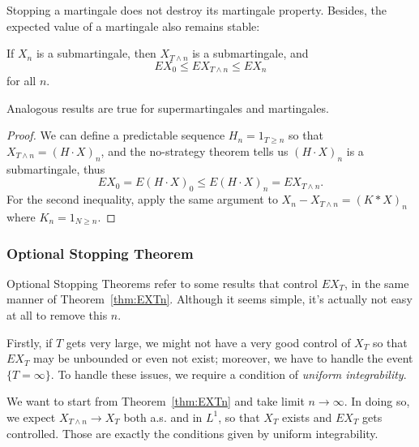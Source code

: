 Stopping a martingale does not destroy its martingale property. Besides, the expected value of a martingale also remains stable:
\begin{theorem}
	\label{thm:EXTn}
	If $X_n$ is a submartingale, then $X_{T \wedge n}$ is a submartingale, and 
	\[
		E X_0 \le  E X_{T \wedge n}  \le  E X_n
	\]
	for all $n$. 

	Analogous results are true for supermartingales and martingales.
\end{theorem}
\begin{proof}
	We can define a predictable sequence $H_n = 1_{T \ge n}$ so that 
	$X_{T \wedge n} = \left( H \cdot X \right) _n$,
	and the no-strategy theorem tells us $(H \cdot X)_n$ is a submartingale, thus
	\[
		E X_0 = E (H \cdot X)_0 \le E(H \cdot X)_n = E X_{T \wedge n}
	.\] 
	For the second inequality, apply the same argument to $X_n - X_{T \wedge n} = (K * X)_n$ where $K_n = 1_{N \ge n}$.
\end{proof}


\subsubsection{Optional Stopping Theorem}

Optional Stopping Theorems refer to some results that control $E X_T$, in the same manner of Theorem~\ref{thm:EXTn}. Although it seems simple, it's actually not easy at all to remove this $n$.

Firstly, if $T$ gets very large, we might not have a very good control of $X_T$ so that $E X_T$ may be unbounded or even not exist; moreover, we have to handle the event $\{T = \infty \}$. To handle these issues, we require a condition of \textit{uniform integrability}.

We want to start from Theorem~\ref{thm:EXTn} and take limit $n \to \infty $. In doing so, we expect $X_{T \wedge n} \to  X_T$ both a.s. and in $L^1$, so that $X_T$ exists and $E X_T$ gets controlled. Those are exactly the conditions given by uniform integrability.


